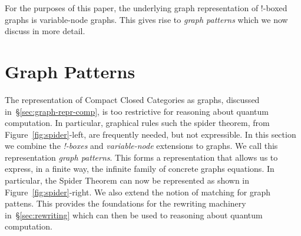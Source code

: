 \documentclass[runningheads]{llncs}
\newcommand{\binterp}[1]{\llbracket #1 \rrbracket_!}
\begin{document}
For the purposes of this paper, the underlying graph representation of
!-boxed graphs is variable-node graphs. This gives rise to \emph{graph
patterns} which we now discuss in more detail. 

\section{Graph Patterns}
\label{sec:patterns}

The representation of Compact Closed Categories as graphs, discussed
in~\S\ref{sec:graph-repr-comp}, is too restrictive for reasoning about
quantum computation. In particular, graphical rules such the spider
theorem, from Figure~\ref{fig:spider}-left, are frequently needed, but
not expressible. In this section we combine the {\em !-boxes} and {\em
  variable-node} extensions to graphs. We call this representation
\emph{graph patterns}. This forms a representation that allows us to
express, in a finite way, the infinite family of concrete graphs
equations. In particular, the Spider Theorem can now be represented as
shown in Figure~\ref{fig:spider}-right. We also extend the notion of
matching for graph pattens.
This provides the foundations for the rewriting machinery
in~\S\ref{sec:rewriting} which can then be used to reasoning about
quantum computation.




\end{document}
